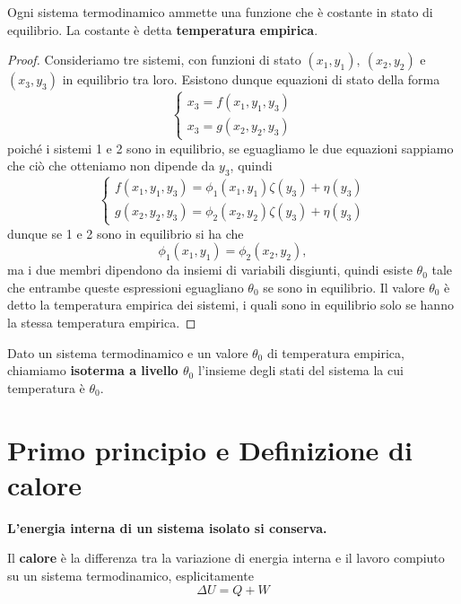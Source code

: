 \begin{proposition}\label{TemperaturaEmpirica}
Ogni sistema termodinamico ammette una funzione che \`e costante in stato di equilibrio. La costante \`e detta \textbf{temperatura empirica}.
\end{proposition}
\begin{proof}
Consideriamo tre sistemi, con funzioni di stato $(x_1, y_1),\ (x_2,y_2)$ e $(x_3,y_3)$ in equilibrio tra loro. Esistono dunque equazioni di stato della forma
\[\begin{cases}
x_3=f(x_1,y_1,y_3)\\
x_3=g(x_2,y_2,y_3)
\end{cases}\]
poich\'e i sistemi 1 e 2 sono in equilibrio, se eguagliamo le due equazioni sappiamo che ci\`o che otteniamo non dipende da $y_3$, quindi
\[\begin{cases}
f(x_1,y_1,y_3)=\phi_1(x_1,y_1)\zeta(y_3)+\eta(y_3)\\
g(x_2,y_2,y_3)=\phi_2(x_2,y_2)\zeta(y_3)+\eta(y_3)
\end{cases}\]
dunque se 1 e 2 sono in equilibrio si ha che 
\[\phi_1(x_1,y_1)=\phi_2(x_2,y_2),\]
ma i due membri dipendono da insiemi di variabili disgiunti, quindi esiste $\theta_0$ tale che entrambe queste espressioni eguagliano $\theta_0$ se sono in equilibrio. Il valore $\theta_0$ \`e detto la temperatura empirica dei sistemi, i quali sono in equilibrio solo se hanno la stessa temperatura empirica.
\end{proof}

\begin{definition}[Isoterme]
Dato un sistema termodinamico e un valore $\theta_0$ di temperatura empirica, chiamiamo \textbf{isoterma a livello $\theta_0$} l'insieme degli stati del sistema la cui temperatura \`e $\theta_0$.
\end{definition}


\section{Primo principio e Definizione di calore}

\begin{fact}
\textbf{L'energia interna di un sistema isolato si conserva.}
\end{fact}

\begin{definition}[Calore]
Il \textbf{calore} \`e la differenza tra la variazione di energia interna e il lavoro compiuto su un sistema termodinamico, esplicitamente
\[\boxed{\Delta U=Q+W}\]
\end{definition}


